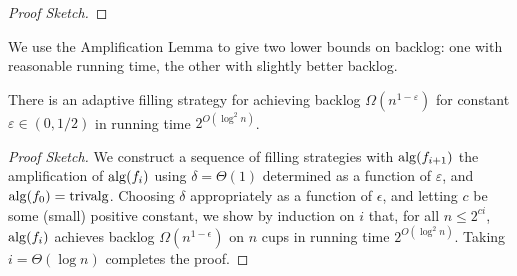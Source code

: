 \begin{proof}[Proof Sketch]

  
\end{proof}

We use the Amplification Lemma to give two lower bounds on
backlog: one with reasonable running time, the other with
slightly better backlog.

\begin{theorem}
  There is an adaptive filling strategy for achieving backlog
  $\Omega(n^{1-\varepsilon})$ for constant $\varepsilon \in (0,
  1/2)$ in running time $2^{O(\log^2 n)}$. 
\end{theorem}
\begin{proof}[Proof Sketch]
  We construct a sequence of filling strategies with $\operatorname{\text{\textup{alg}}}(f_{i+1})$
  the amplification of $\operatorname{\text{\textup{alg}}}(f_i)$ using $\delta = \Theta(1)$
  determined as a function of $\varepsilon$, and $\operatorname{\text{\textup{alg}}}(f_0)=\operatorname{\text{\textup{trivalg}}}$.
  Choosing $\delta$ appropriately as a function of $\epsilon$, and
  letting $c$ be some (small) positive constant, we show by induction
  on $i$ that, for all $n \le 2^{c i}$, $\operatorname{\text{\textup{alg}}}(f_{i})$ achieves backlog
  $\Omega(n^{1 - \epsilon})$ on $n$ cups in running time
  $2^{O(\log^2 n)}$. Taking $i = \Theta(\log n)$ completes the proof.
\end{proof}

